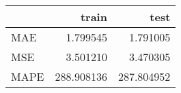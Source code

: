 \begin{tabular}{lrr}
\toprule
{} &       train &        test \\
\midrule
MAE  &    1.799545 &    1.791005 \\
MSE  &    3.501210 &    3.470305 \\
MAPE &  288.908136 &  287.804952 \\
\bottomrule
\end{tabular}
